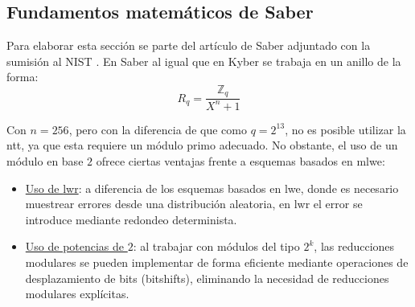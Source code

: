 \subsection{Fundamentos matemáticos de Saber}
Para elaborar esta sección se parte del artículo de Saber adjuntado con la sumisión al NIST \cite{saber-spec-2020}. En Saber al igual que en Kyber se trabaja en un anillo de la forma:
\begin{equation}
	R_q=\dfrac{\mathbb{Z}_q}{X^n+1}
\end{equation}

Con \(n=256\), pero con la diferencia de que como \(q=2^{13}\), no es posible utilizar la \acrshort{ntt}, ya que esta requiere un módulo primo adecuado. No obstante, el uso de un módulo en base \(2\) ofrece ciertas ventajas \cite{modlwr} frente a esquemas basados en \acrshort{mlwe}:
\begin{itemize}
	\item \underline{Uso de \acrshort{lwr}}: a diferencia de los esquemas basados en \acrshort{lwe}, donde es necesario muestrear errores desde una distribución aleatoria, en \acrshort{lwr} el error se introduce mediante redondeo determinista.
	\item \underline{Uso de potencias de \(2\)}: al trabajar con módulos del tipo \(2^k\), las reducciones modulares se pueden implementar de forma eficiente mediante operaciones de desplazamiento de bits (bitshifts), eliminando la necesidad de reducciones modulares explícitas.
\end{itemize}

